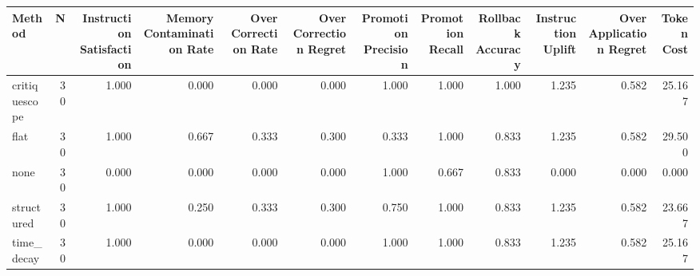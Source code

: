 \begin{tabular}{lrrrrrrrrrrr}
\toprule
Method & N & Instruction Satisfaction & Memory Contamination Rate & Over Correction Rate & Over Correction Regret & Promotion Precision & Promotion Recall & Rollback Accuracy & Instruction Uplift & Over Application Regret & Token Cost \\
\midrule
critiquescope & 30 & 1.000 & 0.000 & 0.000 & 0.000 & 1.000 & 1.000 & 1.000 & 1.235 & 0.582 & 25.167 \\
flat & 30 & 1.000 & 0.667 & 0.333 & 0.300 & 0.333 & 1.000 & 0.833 & 1.235 & 0.582 & 29.500 \\
none & 30 & 0.000 & 0.000 & 0.000 & 0.000 & 1.000 & 0.667 & 0.833 & 0.000 & 0.000 & 0.000 \\
structured & 30 & 1.000 & 0.250 & 0.333 & 0.300 & 0.750 & 1.000 & 0.833 & 1.235 & 0.582 & 23.667 \\
time_decay & 30 & 1.000 & 0.000 & 0.000 & 0.000 & 1.000 & 1.000 & 0.833 & 1.235 & 0.582 & 25.167 \\
\bottomrule
\end{tabular}
